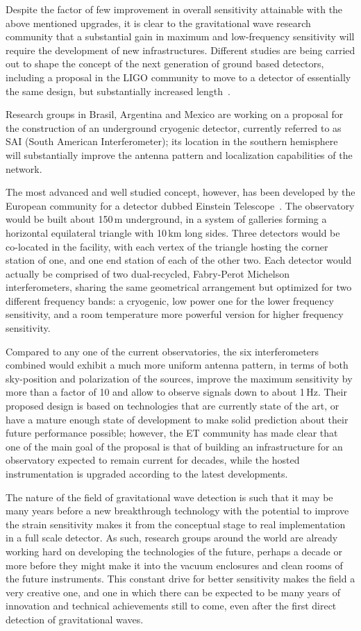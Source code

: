 Despite the factor of few improvement in overall sensitivity attainable with the above mentioned upgrades, it is clear to the gravitational wave research community that a substantial gain in maximum and low-frequency sensitivity will require the development of new infrastructures. 
Different studies are being carried out to shape the concept of the next generation of ground based detectors, including a proposal in the LIGO community to move to a detector of essentially the same design, but substantially increased length~\cite{Dwyer2015}.

Research groups in Brasil, Argentina and Mexico are working on a proposal for the construction of an underground cryogenic detector, currently referred to as SAI (South American Interferometer);  its location in the southern hemisphere will substantially improve the antenna pattern and localization capabilities of the network.

The most advanced and well studied concept, however, has been developed by the European community for a detector dubbed Einstein Telescope~\cite{Punturo2010}.
The observatory would be built about 150\,m underground, in a system of galleries forming a horizontal equilateral triangle with 10\,km long sides. Three detectors would be co-located in the facility, with each vertex of the triangle hosting the corner station of one, and one end station of each of the other two.
Each detector would actually be comprised of two dual-recycled, Fabry-Perot Michelson  interferometers, sharing the same geometrical arrangement but optimized for two different frequency bands: a cryogenic, low power one for the lower frequency sensitivity, and a room temperature more powerful version for higher frequency sensitivity.

Compared to any one of the current observatories, the six interferometers combined would exhibit a much more uniform antenna pattern, in terms of both sky-position and polarization of the sources, improve the maximum sensitivity by more than a factor of 10 and allow to observe signals down to about 1\,Hz. 
Their proposed design is based on technologies that are currently state of the art, or have a mature enough state of development to make solid prediction about their future performance possible; however, the ET community has made clear that one of the main goal of the proposal is that of building an infrastructure for an observatory expected to remain current for decades, while the hosted instrumentation is upgraded according to the latest developments.

The nature of the field of gravitational wave detection is such that it may be many years before a new breakthrough technology with the potential to improve the strain sensitivity makes it from the conceptual stage to real implementation in a full scale detector. 
As such, research groups around the world are already working hard on developing the technologies of the future, perhaps a decade or more before they might make it into the vacuum enclosures and clean rooms of the future instruments. 
This constant drive for better sensitivity makes the field a very creative one, and one in which there can be expected to be many years of innovation and technical achievements still to come, even after the first direct detection of gravitational waves.